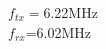 \documentclass[preview]{standalone}
\begin{document}
\begin{center}
$f_{tx}=$6.22MHz\\$f_{rx}$=6.02MHz
\end{center}
\end{document}
